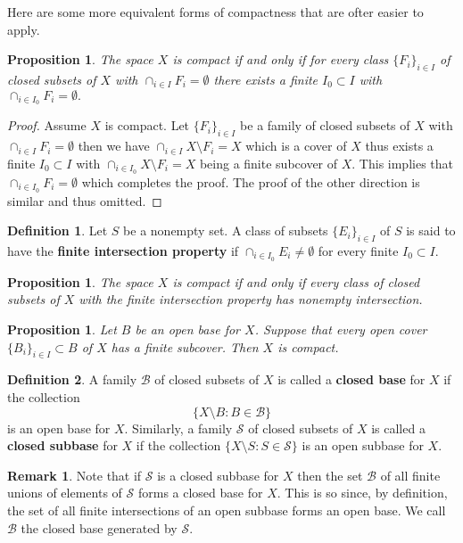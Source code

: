 \documentclass[11pt,a4paper]{article}
\theoremstyle{definition}
\newtheorem{definition}{Definition}[section]
\newtheorem{remark}{Remark}[section]
\theoremstyle{plain}
\newtheorem{proposition}[theorem]{Proposition}
\begin{document}
	Here are some more equivalent forms of compactness that are ofter easier
	to apply.
	\begin{proposition}
		The space $X$ is compact if and only if for every class 
		$\{F_i\}_{i \in I}$ of closed subsets of $X$ with 
		$\cap_{i \in I}{F_i} = \emptyset$ there exists a finite 
		$I_0 \subset I$ with $\cap_{i \in I_0} {F_i} = \emptyset.$
	\end{proposition}
	\begin{proof}
		Assume $X$ is compact. Let $\{F_i\}_{i \in I}$ be a family of closed 
		subsets of $X$ with $\cap_{i \in I}{F_i} = \emptyset$ then 
		we have
		$\cap_{i \in I} {X \setminus F_i} = X$ which is a cover of $X$
		thus exists a finite $I_0 \subset I$ with 
		$\cap_{i \in I_0} {X \setminus F_i} = X$ being a finite subcover
		of $X$. This implies that $\cap_{i \in I_0} {F_i} = \emptyset$
		which completes the proof. The proof of the other direction is
		similar and thus omitted. 
	\end{proof}
	\begin{definition}
		Let $S$ be a nonempty set. A class of subsets $\{E_i\}_{i \in I}$ of 
		$S$ is said to have the \textbf{finite intersection property} if 
		$\cap_{i \in I_0}{E_i} \neq \emptyset$ for every finite 
		$I_0 \subset I$.
	\end{definition}
	\begin{proposition}
		The space $X$ is compact if and only if every class of closed
		subsets of $X$ with the finite intersection property has nonempty 
		intersection.
	\end{proposition}
	\begin{proposition}
		Let $B$ be an open base for $X$. Suppose that every open cover
		$\{B_i\}_{i \in I} \subset B$ of $X$ has a finite subcover. Then $X$ 
		is compact.
	\end{proposition}
	\begin{definition}
		A family $\mathcal{B}$ of closed subsets of $X$ is called a 
		\textbf{closed base} for $X$ if the collection
		\[
			\{X \setminus B \colon B \in \mathcal{B}\}
		\]
		is an open base for $X$. Similarly, a family $\mathcal{S}$ of
		closed subsets of $X$ is called a \textbf{closed subbase} for $X$ 
		if the collection $\{X \setminus S \colon S \in \mathcal{S}\}$ is 
		an open subbase for $X$.
	\end{definition}
	\begin{remark}
		Note that if $\mathcal{S}$ is a closed subbase for $X$ then the set 
		$\mathcal{B}$ of all finite unions of elements of $\mathcal{S}$ forms 
		a closed base for $X$. This is so since, by definition,
		the set of all finite intersections of an open subbase forms an open 
		base. We call $\mathcal{B}$ the closed base generated by 
		$\mathcal{S}$.
	\end{remark}
\end{document}
